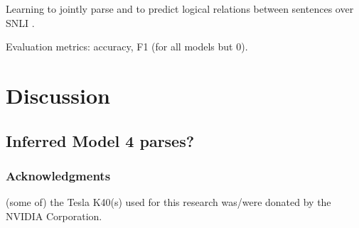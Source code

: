 \documentclass[11pt,letterpaper]{article}
\begin{document}
Learning to jointly parse and to predict logical relations between sentences over SNLI  \cite{snli:emnlp2015}.

Evaluation metrics: accuracy, F1 (for all models but 0).

\section{Discussion}

\subsection{Inferred Model 4 parses?}

\subsubsection*{Acknowledgments}

(some of) the Tesla K40(s) used for this research was/were donated by the NVIDIA Corporation.


 
\end{document}
